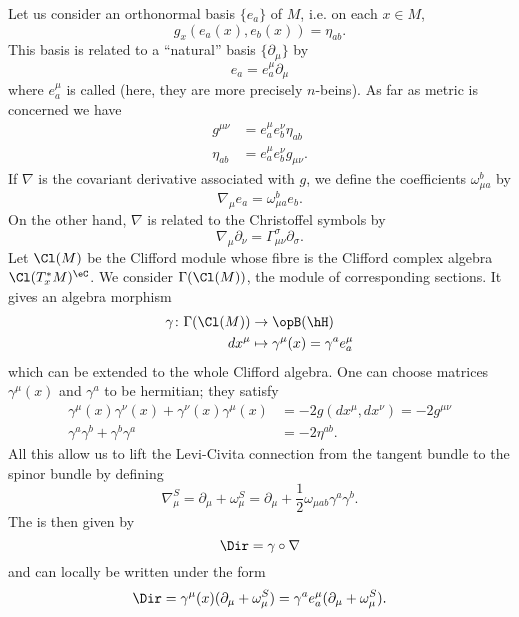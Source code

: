 Let us consider an orthonormal basis $\{ e_a \}$ of $M$, i.e. on each $x\in M$,
\[
  g_x(e_a(x),e_b(x))=\eta_{ab}.
\]
This basis is related to a ``natural'' basis $\{ \partial_{\mu} \}$ by
\begin{equation}
  e_a=e_a^{\mu}\partial_{\mu}
\end{equation}
where  $e_a^{\mu}$ is called  (here, they are more precisely $n$-beins). As far as metric is concerned we have
\begin{subequations}
\begin{align}
	g^{\mu\nu}&=e_a^{\mu}e_b^{\nu}\eta_{ab}\\
	\eta_{ab}&=e_a^{\mu}e_b^{\nu}g_{\mu\nu}.
\end{align}
\end{subequations}
If $\nabla$ is the covariant derivative associated with $g$, we define the coefficients $\omega_{\mu a}^b$ by
\begin{equation}
\nabla_{\mu}e_a=\omega_{\mu a}^be_b.
\end{equation}
On the other hand, $\nabla$ is related to the Christoffel symbols by
\begin{equation}
\nabla_{\mu}\partial_{\nu}=\Gamma_{\mu\nu}^{\sigma}\partial_{\sigma}.
\end{equation}
Let $\Cl(M)$ be the Clifford module whose fibre is the Clifford complex algebra $\Cl(T^*_xM)^{\eC}$. We consider $\Gamma(\Cl(M))$, the module of corresponding sections. It gives an algebra morphism
\begin{equation}
\begin{aligned}
 \gamma\colon\Gamma(\Cl(M))&\to \opB(\hH) \\
dx^{\mu}&\mapsto \gamma^{\mu}(x)=\gamma^ae_a^{\mu}
\end{aligned}
\end{equation}
which can be extended to the whole Clifford algebra. One can choose matrices $\gamma^{\mu}(x)$ and $\gamma^a$ to be hermitian; they satisfy
\begin{subequations}
\begin{align}
\gamma^{\mu}(x)\gamma^{\nu}(x)+\gamma^{\nu}(x)\gamma^{\mu}(x)&=-2g(dx^{\mu},dx^{\nu})=-2g^{\mu\nu}\\
\gamma^a\gamma^b+\gamma^b\gamma^a&=-2\eta^{ab}.
\end{align}
\end{subequations}
All this allow us to lift the Levi-Civita connection from the tangent bundle to the spinor bundle by defining
\begin{equation}
\nabla_{\mu}^S=\partial_{\mu}+\omega^S_{\mu}=\partial_{\mu}+\frac{ 1 }{2}\omega_{\mu ab}\gamma^a\gamma^b.
\end{equation}
The  is then given by
\[
  \Dir=\gamma\circ\nabla
\]
and can locally be written under the form
\begin{equation}  \label{eq_Dirac_deux}
\Dir=\gamma^{\mu}(x)(\partial_{\mu}+\omega_{\mu}^S)
	=\gamma^ae_a^{\mu}(\partial_{\mu}+\omega^S_{\mu}).
\end{equation}
